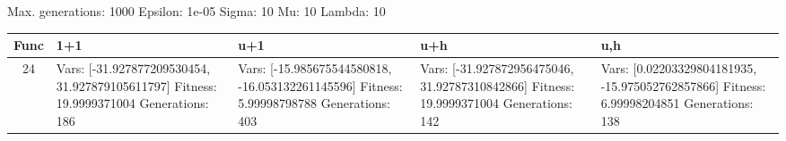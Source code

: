 \documentclass[landscape,11pt]{article}
\begin{document}
\newpage
Max. generations: 1000 Epsilon: 1e-05 Sigma: 10 Mu: 10 Lambda: 10 \\
\begin{tabular}{|c|p{5.4cm}|p{5.4cm}|p{5.4cm}|p{5.4cm}|}
\hline
Func & 1+1 & u+1 & u+h & u,h \\ 
\hline 24 & Vars: [-31.927877209530454, 31.927879105611797] Fitness: 19.9999371004 Generations: 186 & Vars: [-15.985675544580818, -16.053132261145596] Fitness: 5.99998798788 Generations: 403 & Vars: [-31.927872956475046, 31.92787310842866] Fitness: 19.9999371004 Generations: 142 & Vars: [0.02203329804181935, -15.975052762857866] Fitness: 6.99998204851 Generations: 138 \\
 \hline 
\end{tabular}
\end{document}
